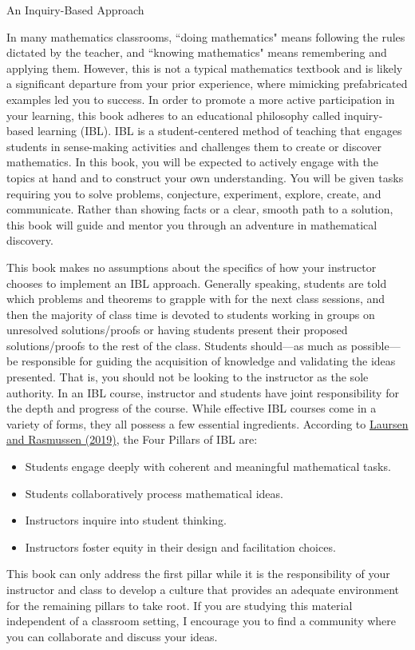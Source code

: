 \begin{section}{An Inquiry-Based Approach}\label{sec:IBLApproach}

In many mathematics classrooms, ``doing mathematics" means following the rules dictated by the teacher, and ``knowing mathematics" means remembering and applying them. However, this is not a typical mathematics textbook and is likely a significant departure from your prior experience, where mimicking prefabricated examples led you to success. In order to promote a more active participation in your learning, this book adheres to an educational philosophy called inquiry-based learning (IBL). IBL is a student-centered method of teaching that engages students in sense-making activities and challenges them to create or discover mathematics.  In this book, you will be expected to actively engage with the topics at hand and to construct your own understanding.  You will be given tasks requiring you to solve problems, conjecture, experiment, explore, create, and communicate.  Rather than showing facts or a clear, smooth path to a solution, this book will guide and mentor you through an adventure in mathematical discovery. 

This book makes no assumptions about the specifics of how your instructor chooses to implement an IBL approach. Generally speaking, students are told which problems and theorems to grapple with for the next class sessions, and then the majority of class time is devoted to students working in groups on unresolved solutions/proofs or having students present their proposed solutions/proofs to the rest of the class. Students should---as much as possible---be responsible for guiding the acquisition of knowledge and validating the ideas presented. That is, you should not be looking to the instructor as the sole authority. In an IBL course, instructor and students have joint responsibility for the depth and progress of the course. While effective IBL courses come in a variety of forms, they all possess a few essential ingredients. According to \href{https://www.colorado.edu/eer/sites/default/files/attached-files/laursenrasmussencommentaryauthorversion0219.pdf}{Laursen and Rasmussen (2019)}, the Four Pillars of IBL are:
\begin{itemize}
\item Students engage deeply with coherent and meaningful mathematical tasks.
\item Students collaboratively process mathematical ideas.
\item Instructors inquire into student thinking.
\item Instructors foster equity in their design and facilitation choices.
\end{itemize}
This book can only address the first pillar while it is the responsibility of your instructor and class to develop a culture that provides an adequate environment for the remaining pillars to take root.  If you are studying this material independent of a classroom setting, I encourage you to find a community where you can collaborate and discuss your ideas.


\end{section}
